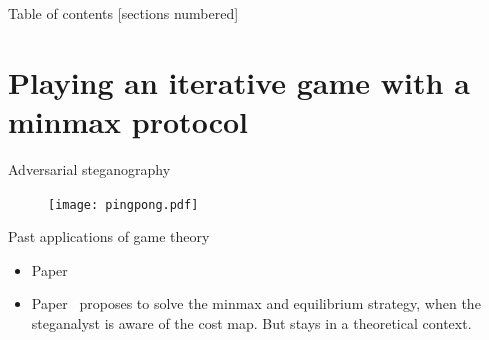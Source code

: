 \documentclass[10pt,aspectratio=169]{beamer}
\begin{document}



    


\begin{frame}{Table of contents}
    [sections numbered]
    \tableofcontents[hideallsubsections]
\end{frame}



\section{Playing an iterative game with a \textbf{minmax} protocol}


\begin{frame}{Adversarial steganography}
    \begin{figure}
        \texttt{[image: pingpong.pdf]}
    \end{figure}
\end{frame}


\begin{frame}{Past applications of game theory}

    \begin{itemize}
        \item Paper~
        \item Paper~ proposes to solve the minmax and equilibrium strategy, when the steganalyst is aware of the cost map. But stays in a theoretical context.
    \end{itemize}
    
\end{frame}
\end{document}
